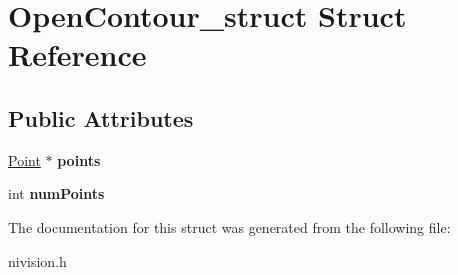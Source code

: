\hypertarget{structOpenContour__struct}{
\section{OpenContour\_\-struct Struct Reference}
\label{structOpenContour__struct}
}
\subsection*{Public Attributes}
\begin{DoxyCompactItemize}
\item 
\hypertarget{structOpenContour__struct_a2ad7b0c2f5e476352369e277c95e1e09}{
\hyperlink{structPoint__struct}{Point} $\ast$ {\bfseries points}}
\label{structOpenContour__struct_a2ad7b0c2f5e476352369e277c95e1e09}

\item 
\hypertarget{structOpenContour__struct_a6c85a5ebccc9cafc04b77216990b3d62}{
int {\bfseries numPoints}}
\label{structOpenContour__struct_a6c85a5ebccc9cafc04b77216990b3d62}

\end{DoxyCompactItemize}


The documentation for this struct was generated from the following file:\begin{DoxyCompactItemize}
\item 
nivision.h\end{DoxyCompactItemize}
